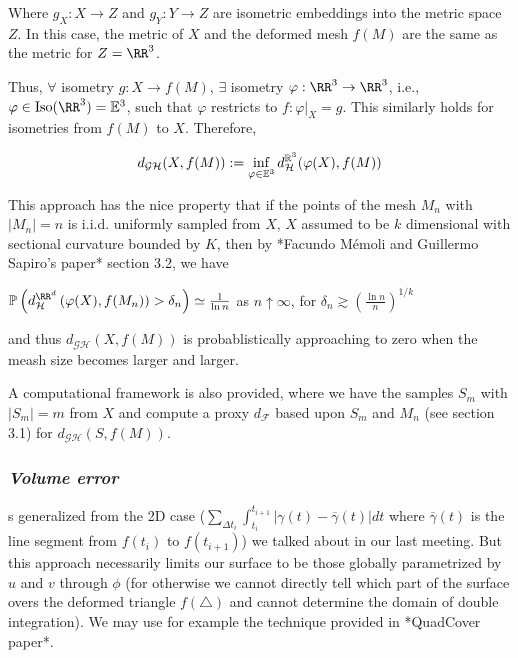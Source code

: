 Where $g_X: X \rightarrow Z$ and $g_Y: Y \rightarrow Z$ are 
isometric embeddings into the metric space $Z$.
In this case, the metric of $X$ and the deformed mesh $f(M)$ 
are the same as the metric for $Z=\RR^3$. 

\spa

Thus, $\forall$ isometry $g:X\to f(M)$, $\exists$ isometry 
$\varphi: \RR^3 \to \RR^3$, 
i.e., $\varphi \in \operatorname{Iso}(\RR^3)=\mathbb{E}^3$, 
such that $\varphi$ restricts to $f: \varphi|_X=g$. This similarly holds for isometries from 
$f(M)$ to $X$. Therefore,

\begin{align*}
    d_{\mathcal{G H}}(X, f(M)):=\inf_{\varphi \in \mathbb{E}^3} d_{\mathcal{H}}^{\mathbb{R}^3}(\varphi(X), f(M))
\end{align*}

This approach has the nice property that if the points of the mesh $M_n$ 
with $|M_n|=n$ is i.i.d. uniformly sampled from $X$, $X$ assumed to be $k$ 
dimensional with sectional curvature bounded by $K$, then by *Facundo Mémoli 
and Guillermo Sapiro's paper* section 3.2, we have 

$\mathbb{P}\left(d_{\mathcal{H}}^{\RR^d}\left(\varphi(X), f(M_n)\right)>\delta_n\right) \simeq \frac{1}{\ln n}$ as $n \uparrow \infty$, for $\delta_n \gtrsim \left(\frac{\ln n}{n}\right)^{1 / k}$

and thus $d_{\mathcal{G H}}(X, f(M))$ is probablistically approaching to zero when the meash size becomes larger and larger. 

\spa

A computational framework is also provided, where we have the samples 
$S_m$ with $|S_m|=m$ from $X$ and compute a proxy $d_\mathcal{F}$ 
based upon $S_m$ and $M_n$ (see section 3.1) for 
$d_{\mathcal{G H}}(S, f(M))$.

\subsubsection{\emph{Volume error}}

s generalized from the 2D case ($\sum_{\Delta t_i}\int_{t_i}^{t_{i+1}}|\gamma(t)-\overline{\gamma}(t)|dt$ where $\overline{\gamma}(t)$ is the line segment from $f(t_i)$ to $f(t_{i+1})$) we talked about in our last meeting. But this approach necessarily limits our surface to be those globally parametrized by $u$ and $v$ through $\phi$ (for otherwise we cannot directly tell which part of the surface overs the deformed triangle $f(\triangle)$ and cannot determine the domain of double integration). We may use for example the technique provided in *QuadCover paper*.


